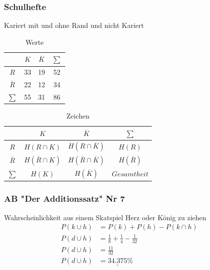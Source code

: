 \documentclass[a4paper,12pt]{article}
\begin{document}
\subsubsection*{Schulhefte}
Kariert mit und ohne Rand und nicht Kariert\\
\begin{table}[h!]
  \begin{center}
    \caption{Werte}
    \label{tab:table1}
    \begin{tabular}{c|c|c|c} %
      \textbf{} & \textbf{$K$} & \textbf{$\overline{K}$} & \textbf{$\sum$}\\
      \hline
      $R$ & 33 & 19 & 52\\
      \hline
      $\overline{R}$ & 22 & 12 & 34\\
      \hline
      $\sum$ & 55 & 31 & 86\\
    \end{tabular}
  \end{center}
\end{table}
\begin{table}[h!]
  \begin{center}
    \caption{Zeichen}
    \label{tab:table1}
    \begin{tabular}{c|c|c|c} %
      \textbf{} & \textbf{$K$} & \textbf{$\overline{K}$} & \textbf{$\sum$}\\
      \hline
      $R$ & $H(R \cap K)$ & $H(R \cap \overline{K})$ & $H(R)$\\
      \hline
      $\overline{R}$ & $H(\overline{R} \cap K)$ & $H(\overline{R} \cap \overline{K})$ & $H(\overline{R})$\\
      \hline
      $\sum$ & $H(K)$ & $H(\overline{K})$ & $Gesamtheit$\\
    \end{tabular}
  \end{center}
\end{table}
\subsubsection*{AB "Der Additionssatz" Nr 7}
Wahrscheinlichkeit aus einem Skatspiel Herz oder König zu ziehen\\
\begin{equation}
\begin{split}
P(k \cup h) & = P(k) + P(h) - P(k \cap h)\\
P(d \cup h) & = \frac{1}{8} + \frac{1}{4} - \frac{1}{32}\\
P(d \cup h) & = \frac{11}{32}\\
P(d \cup h) & = \underline{\underline{34.375}} \%\\
\end{split}
\end{equation}
\end{document}
